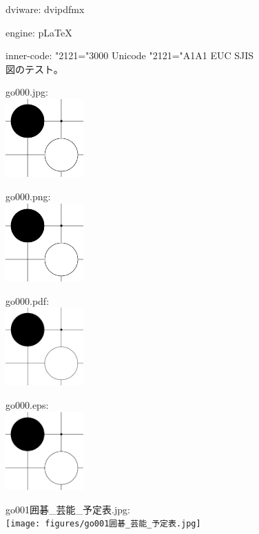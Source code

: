 \documentclass[autodetect-engine,twocolumn]{jsarticle}
\newif\ifuptexmode
\begin{document}
\parindent0mm

dviware: dvipdfmx

\ifuptexmode
engine: upLaTeX
\typeout{### engine: upLaTeX ###}
\else
engine: pLaTeX
\fi

inner-code: %
\ifnum\jis"2121="3000 Unicode%
\else
 \ifnum\jis"2121="A1A1
  EUC%
 \else
  SJIS%
\fi
\fi
\\

図のテスト。

go000.jpg:\\
\includegraphics[width=30mm,bb=0 0 600 600]{figures/go000.jpg}

go000.png:\\
\includegraphics[width=30mm,bb=0 0 600 600]{figures/go000.png}

go000.pdf:\\
\includegraphics[width=30mm,bb=0 0 600 600]{figures/go000.pdf}

go000.eps:\\
\includegraphics[width=30mm]{figures/go000.eps}

go001囲碁\_芸能\_予定表.jpg:\\ %
\texttt{[image: figures/go001囲碁\_芸能\_予定表.jpg]}
\end{document}
